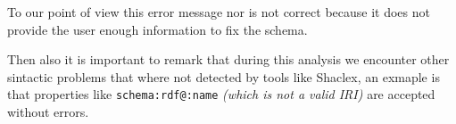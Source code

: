 To our point of view this error message nor is not correct because it does not provide the user enough information to fix the schema.

Then also it is important to remark that during this analysis we encounter other sintactic problems that where not detected by tools like Shaclex,
an exmaple is that properties like \texttt{schema:rdf@:name} \textit{(which is not a valid IRI)} are accepted without errors.

\begin{table}
  \centering
  \caption{Detection of the different sintactic errors by the current existing ShEx tools that sintactically analyze the
  shape expressions.}
  \label{tb:sintactic-errors}
\end{table}
